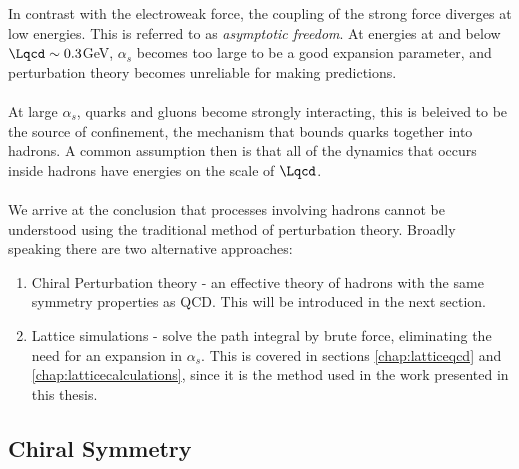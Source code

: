 In contrast with the electroweak force, the coupling of the strong force diverges at low energies. This is referred to as {\it{asymptotic freedom}}. At energies at and below $\Lqcd \sim 0.3$GeV, $\alpha_s$ becomes too large to be a good expansion parameter, and perturbation theory becomes unreliable for making predictions.
\\ \\
At large $\alpha_s$, quarks and gluons become strongly interacting, this is beleived to be the source of confinement, the mechanism that bounds quarks together into hadrons. A common assumption then is that all of the dynamics that occurs inside hadrons have energies on the scale of $\Lqcd$.
\\ \\
We arrive at the conclusion that processes involving hadrons cannot be understood using the traditional method of perturbation theory. Broadly speaking there are two alternative approaches:
\begin{enumerate}
\item
  Chiral Perturbation theory - an effective theory of hadrons with the same symmetry properties as QCD. This will be introduced in the next section.
\item
  Lattice simulations - solve the path integral by brute force, eliminating the need for an expansion in $\alpha_s$. This is covered in sections \ref{chap:latticeqcd} and \ref{chap:latticecalculations}, since it is the method used in the work presented in this thesis.
\end{enumerate}

\subsection{Chiral Symmetry}

{}

